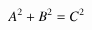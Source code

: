 \documentclass[preview]{standalone}
\begin{document}
\centering
\begin{align*}
{{\color[RGB]{0, 0, 1}A}}^2 + {{\color[RGB]{0, 0, 2}B}}^2 = {{\color[RGB]{0, 0, 3}C}}^2
\end{align*}
\end{document}
